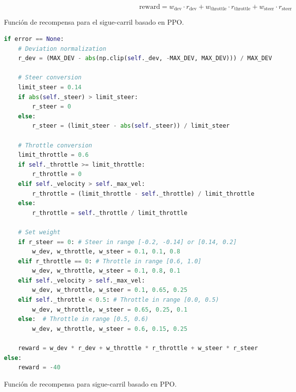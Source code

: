   \begin{myequation}[h]
    \begin{equation} 
      \text{reward} = w_{\text{dev}} \cdot r_{\text{dev}} + w_{\text{throttle}} \cdot r_{\text{throttle}} + w_{\text{steer}} \cdot r_{\text{steer}}
    \end{equation} 
    \caption{Función de recompensa para el sigue-carril basado en \ac{PPO}.}
\label{eq:rew_ppo}
  \end{myequation}

\begin{code}[H]
\begin{lstlisting}[language=Python]
if error == None:
    # Deviation normalization
    r_dev = (MAX_DEV - abs(np.clip(self._dev, -MAX_DEV, MAX_DEV))) / MAX_DEV

    # Steer conversion
    limit_steer = 0.14
    if abs(self._steer) > limit_steer:
        r_steer = 0
    else:
        r_steer = (limit_steer - abs(self._steer)) / limit_steer

    # Throttle conversion
    limit_throttle = 0.6
    if self._throttle >= limit_throttle:
        r_throttle = 0
    elif self._velocity > self._max_vel:
        r_throttle = (limit_throttle - self._throttle) / limit_throttle
    else:
        r_throttle = self._throttle / limit_throttle

    # Set weight
    if r_steer == 0: # Steer in range [-0.2, -0.14] or [0.14, 0.2]
        w_dev, w_throttle, w_steer = 0.1, 0.1, 0.8
    elif r_throttle == 0: # Throttle in range [0.6, 1.0]
        w_dev, w_throttle, w_steer = 0.1, 0.8, 0.1
    elif self._velocity > self._max_vel:
        w_dev, w_throttle, w_steer = 0.1, 0.65, 0.25
    elif self._throttle < 0.5: # Throttle in range [0.0, 0.5)
        w_dev, w_throttle, w_steer = 0.65, 0.25, 0.1
    else:  # Throttle in range [0.5, 0.6)
        w_dev, w_throttle, w_steer = 0.6, 0.15, 0.25

    reward = w_dev * r_dev + w_throttle * r_throttle + w_steer * r_steer
else:
    reward = -40
\end{lstlisting}
\caption[Función de recompensa para sigue-carril basado en \ac{PPO}]{Función de recompensa para sigue-carril basado en \ac{PPO}.}
\label{cod:rew_ppo}
\end{code}

